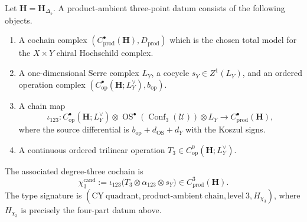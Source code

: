 \begin{definition}
\label{def:chi3-product-ambient-datum}
Let \(\mathbf H=\mathbf H_{\Delta _5}\).  A product-ambient three-point
datum consists of the following objects.
\begin{enumerate}[label=\textup{(\roman*)}]
\item A cochain complex
\((C^\bullet_{\mathrm{prod}}(\mathbf H),D_{\mathrm{prod}})\)
which is the chosen total model for the \(X\times Y\) chiral Hochschild
complex.
\item A one-dimensional Serre complex \(L_Y\), a cocycle
\(s_Y\in Z^1(L_Y)\), and an ordered operation complex
\((C^\bullet_{\mathrm{op}}(\mathbf H;L_Y^\vee),b_{\mathrm{op}})\).
\item A chain map
\begin{equation}
\label{eq:chi3-totalisation-map}
 \iota_{123}\colon
 C^\bullet_{\mathrm{op}}(\mathbf H;L_Y^\vee)
 \otimes \operatorname{OS}^\bullet(\operatorname{Conf}_3(\mathcal U))
 \otimes L_Y
 \longrightarrow C^\bullet_{\mathrm{prod}}(\mathbf H),
\end{equation}
where the source differential is
\(b_{\mathrm{op}}+d_{\mathrm{OS}}+d_Y\) with the Koszul signs.
\item A continuous ordered trilinear operation
\(T_3\in C^0_{\mathrm{op}}(\mathbf H;L_Y^\vee)\).
\end{enumerate}
The associated degree-three cochain is
\begin{equation}
\label{eq:chirhoch3-chain-level-Delta5}
 \chi_3^{\mathrm{cand}}
 :=\iota_{123}
 \bigl(T_3\otimes\alpha_{123}\otimes s_Y\bigr)
 \in C^3_{\mathrm{prod}}(\mathbf H).
\end{equation}
The type signature is
\(
 (\mathrm{CY\ quadrant},\mathrm{product\text{-}ambient\ chain},
  \mathrm{level}\ 3,H_{\chi_3})
\), where \(H_{\chi_3}\) is precisely the four-part datum above.
\end{definition}

